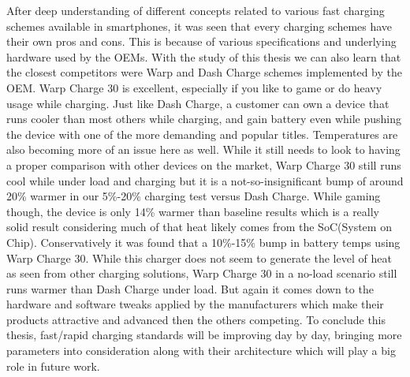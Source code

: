 \documentclass[conference]{IEEEtran}
\begin{document}
After deep understanding of different concepts related to various fast charging schemes available in smartphones, it was seen that every charging schemes have their own pros and cons. This is because of various specifications and underlying hardware used by the OEMs. With the study of this thesis we can also learn that the closest competitors were Warp and Dash Charge schemes implemented by the OEM. Warp Charge 30 is excellent, especially if you like to game or do heavy usage while charging. Just like Dash Charge, a customer can own a device that runs cooler than most others while charging, and gain battery even while pushing the device with one of the more demanding and popular titles. Temperatures are also becoming more of an issue here as well. While it still needs to look to having a proper comparison with other devices on the market, Warp Charge 30 still runs cool while under load and charging but it is a not-so-insignificant bump of around 20\% warmer in our 5\%-20\% charging test versus Dash Charge. While gaming though, the device is only 14\% warmer than baseline results which is a really solid result considering much of that heat likely comes from the SoC(System on Chip). Conservatively it was found that a 10\%-15\% bump in battery temps using Warp Charge 30. While this charger does not seem to generate the level of heat as seen from other charging solutions, Warp Charge 30 in a no-load scenario still runs warmer than Dash Charge under load. But again it comes down to the hardware and software tweaks applied by the manufacturers which make their products attractive and advanced then the others competing. To conclude this thesis, fast/rapid charging standards will be improving day by day, bringing more parameters into consideration along with their architecture which will play a big role in future work. 
\end{document}
